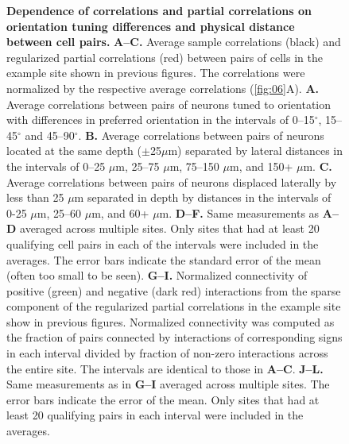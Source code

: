 \documentclass[10pt]{article}
\begin{document}
\begin{figure}[!ht]
    \begin{center}
    \end{center}
    \caption{{\bf Dependence of correlations and partial correlations on orientation tuning differences and physical distance between cell pairs.}
    {\bf A--C.} Average sample correlations (black) and regularized partial correlations (red) between pairs of cells in the example site shown in previous figures. The correlations were normalized by the respective average correlations (\ref{fig:06}\;A).
    {\bf A.} Average correlations between pairs of neurons tuned to orientation with differences in preferred orientation in the intervals of 0--15$^\circ$, 15--45$^\circ$ and 45--90$^\circ$. 
    {\bf B.} Average correlations between pairs of neurons located at the same depth ($\pm$25$\mu$m) separated by lateral distances in the intervals of 0--25 $\mu$m, 25--75 $\mu$m, 75--150 $\mu$m, and 150+ $\mu$m.
    {\bf C.} Average correlations between pairs of neurons displaced laterally by less than 25 $\mu$m separated in depth by distances in the intervals of 0-25 $\mu$m, 25--60 $\mu$m, and 60+ $\mu$m.
    {\bf D--F.} Same measurements as {\bf A--D} averaged across multiple sites. Only sites that had at least 20 qualifying cell pairs in each of the intervals were included in the averages. The error bars indicate the standard error of the mean (often too small to be seen).
    {\bf G--I.} Normalized connectivity of positive (green) and negative (dark red) interactions from the sparse component of the regularized partial correlations in the example site show in previous figures. Normalized connectivity was computed as the fraction of pairs connected by interactions of corresponding signs in each interval divided by fraction of non-zero interactions across the entire site. The intervals are identical to those in {\bf A--C}.
    {\bf J--L.} Same measurements as in {\bf G--I} averaged across multiple sites. The error bars indicate the error of the mean. Only sites that had at least 20 qualifying pairs in each interval were included in the averages. 
}
\label{fig:07}
\end{figure}
\end{document}
